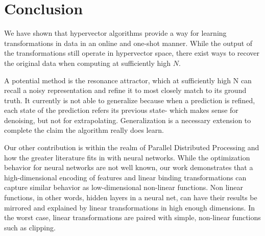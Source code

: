 \documentclass{article}
\begin{document}
\section{Conclusion}
We have shown that hypervector algorithms provide a way for learning transformations in data in an online and one-shot manner. While the output of the transformations still operate in hypervector space, there exist ways to recover the original data when computing at sufficiently high $N$. 

A potential method is the resonance attractor, which at sufficiently high N can recall a noisy representation and refine it to most closely match to its ground truth. It currently is not able to generalize because when a prediction is refined, each state of the prediction refers its previous state- which makes sense for denoising, but not for extrapolating. Generalization is a necessary extension to complete the claim the algorithm really does learn.

Our other contribution is within the realm of Parallel Distributed Processing and how the greater literature fits in with neural networks. While the optimization behavior for neural networks are not well known, our work demonstrates that a high-dimensional encoding of features and linear binding transformations can capture similar behavior as low-dimensional non-linear functions. Non linear functions, in other words, hidden layers in a neural net, can have their results be mirrored and explained by linear transformations in high enough dimensions. In the worst case, linear transformations are paired with simple, non-linear functions such as clipping. 




%



%

\end{document}
